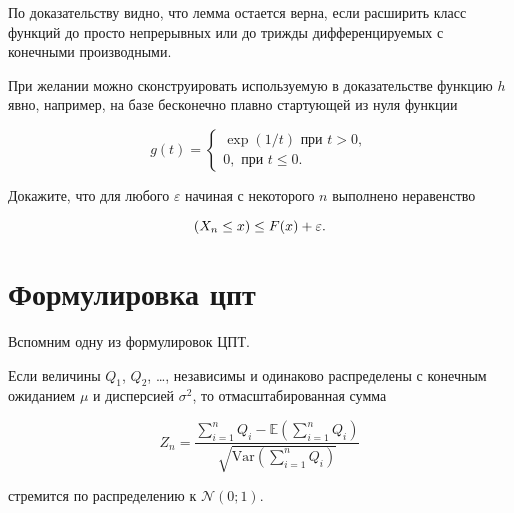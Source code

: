 \documentclass[
  letterpaper,
  DIV=11,
  numbers=noendperiod]{scrartcl}
\newcommand\cN{{\mathcal{N}}}
\let\P\relax
\newcommand\P{{\mathbb{P}}}
\newcommand\E{{\mathbb{E}}}
\newcommand\Var{{\mathrm{Var}}}
\begin{document}
По доказательству видно, что лемма остается верна, если расширить класс
функций до просто непрерывных или до трижды дифференцируемых с конечными
производными.

При желании можно сконструировать используемую в доказательстве функцию
\(h\) явно, например, на базе бесконечно плавно стартующей из нуля
функции

\[
g(t) = \begin{cases}
\exp(1/t) \text{ при } t>0, \\
0, \text{ при } t\leq 0.
\end{cases}
\]

\begin{tcolorbox}[enhanced jigsaw, breakable, colbacktitle=quarto-callout-caution-color!10!white, opacitybacktitle=0.6, colback=white, bottomrule=.15mm, arc=.35mm, title=\textcolor{quarto-callout-caution-color}{\faFire}\hspace{0.5em}{Упражнение к лемме}, leftrule=.75mm, rightrule=.15mm, opacityback=0, left=2mm, toptitle=1mm, bottomtitle=1mm, colframe=quarto-callout-caution-color-frame, titlerule=0mm, coltitle=black, toprule=.15mm]
Докажите, что для любого \(\varepsilon\) начиная с некоторого \(n\)
выполнено неравенство

\[
\P(X_n \leq x) \leq F(x) + \varepsilon.
\]
\end{tcolorbox}

\hypertarget{ux444ux43eux440ux43cux443ux43bux438ux440ux43eux432ux43aux430-ux446ux43fux442}{%
\section{Формулировка
цпт}\label{ux444ux43eux440ux43cux443ux43bux438ux440ux43eux432ux43aux430-ux446ux43fux442}}

Вспомним одну из формулировок ЦПТ.

\begin{tcolorbox}[enhanced jigsaw, breakable, colbacktitle=quarto-callout-note-color!10!white, opacitybacktitle=0.6, colback=white, bottomrule=.15mm, arc=.35mm, title=\textcolor{quarto-callout-note-color}{\faInfo}\hspace{0.5em}{Центральная предельная теорема}, leftrule=.75mm, rightrule=.15mm, opacityback=0, left=2mm, toptitle=1mm, bottomtitle=1mm, colframe=quarto-callout-note-color-frame, titlerule=0mm, coltitle=black, toprule=.15mm]
Если величины \(Q_1\), \(Q_2\), \ldots, независимы и одинаково
распределены с конечным ожиданием \(\mu\) и дисперсией \(\sigma^2\), то
отмасштабированная сумма

\[
Z_n = \frac{\sum_{i=1}^n Q_i - \E(\sum_{i=1}^n Q_i)}{\sqrt{\Var(\sum_{i=1}^n Q_i)}}
\]

стремится по распределению к \(\cN(0;1)\).
\end{tcolorbox}
\end{document}
